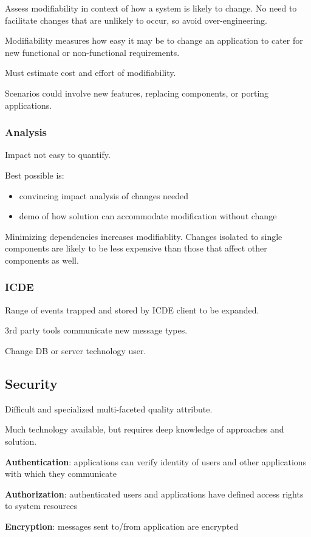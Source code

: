 \documentclass[11pt]{article}
\begin{document}
Assess modifiability in context of how a system is likely to change.
No need to facilitate changes that are unlikely to occur, so avoid over-engineering.

Modifiability measures how easy it may be to change an application to cater for new functional
or non-functional requirements.

Must estimate cost and effort of modifiability.

Scenarios could involve new features, replacing components, or porting applications.
\subsubsection{Analysis}
\label{sec:org8b5acd3}
Impact not easy to quantify.

Best possible is:
\begin{itemize}
\item convincing impact analysis of changes needed
\item demo of how solution can accommodate modification without change
\end{itemize}

Minimizing dependencies increases modifiablity.
Changes isolated to single components are likely to be less expensive than those that affect other
components as well.
\subsubsection{ICDE}
\label{sec:org27d4958}
Range of events trapped and stored by ICDE client to be expanded.

3rd party tools communicate new message types.

Change DB or server technology user.
\subsection{Security}
\label{sec:org557f510}
Difficult and specialized multi-faceted quality attribute.

Much technology available, but requires deep knowledge of approaches and solution.

\textbf{Authentication}: applications can verify identity of users and other applications with which
they communicate

\textbf{Authorization}: authenticated users and applications have defined access rights to system resources

\textbf{Encryption}: messages sent to/from application are encrypted
\end{document}
